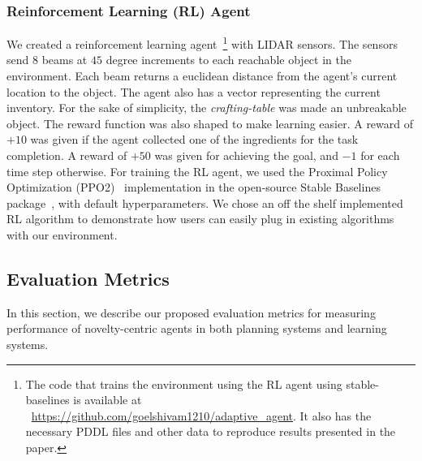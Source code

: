 \documentclass[sigconf]{aamas}
\begin{document}
\subsubsection{Reinforcement Learning (RL) Agent}
\label{sec:rl_agent}
We created a reinforcement learning agent~\footnote{The code that trains the environment using the RL agent using stable-baselines is available at ~\url{https://github.com/goelshivam1210/adaptive_agent}. It also has the necessary PDDL files and other data to reproduce results presented in the paper.} with LIDAR sensors. The sensors send $8$ beams at $45$ degree increments to each reachable object in the environment. Each beam returns a euclidean distance from the agent's current location to the object. The agent also has a vector representing the current inventory. 
For the sake of simplicity, the \emph{crafting-table} was made an unbreakable object.
The reward function was also shaped to make learning easier. A reward of $+10$ was given if the agent collected one of the ingredients for the task completion. A reward of $+50$ was given for achieving the goal, and $-1$ for each time step otherwise.
For training the RL agent, we used the Proximal Policy Optimization (PPO2)~\citep{schulman2017proximal} implementation in the open-source
Stable Baselines package~\citep{stable-baselines3}, with default hyperparameters. We chose an off the shelf implemented RL algorithm to demonstrate how users can easily plug in existing algorithms with our environment.

\subsection{Evaluation Metrics}
\label{sec:eval_metrics}



In this section, we describe our proposed evaluation metrics for measuring performance of novelty-centric agents in both planning systems and learning systems.
\end{document}
